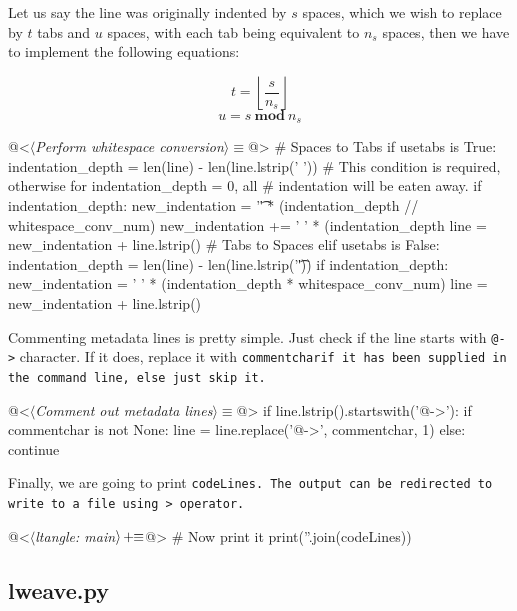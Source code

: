 Let us say the line was originally indented by $s$ spaces, which we wish to replace by $t$ tabs and $u$
spaces, with each tab being equivalent to $n_s$ spaces, then we have to implement the following equations: 

$$t = \left\lfloor \frac{s}{n_s} \right\rfloor$$
$$u = s\ \mathbf{mod}\ n_s$$

\begin{code}
@<$\langle$\textit{Perform whitespace conversion}$\rangle\equiv$@>
# Spaces to Tabs
if usetabs is True:
    indentation_depth = len(line) - len(line.lstrip(' '))
    # This condition is required, otherwise for indentation_depth = 0, all
    # indentation will be eaten away.
    if indentation_depth:
        new_indentation = '\t' * (indentation_depth // whitespace_conv_num)
        new_indentation += ' ' * (indentation_depth %
        line = new_indentation + line.lstrip()
# Tabs to Spaces
elif usetabs is False:
    indentation_depth = len(line) - len(line.lstrip('\t'))
    if indentation_depth:
        new_indentation = ' ' * (indentation_depth * whitespace_conv_num)
        line = new_indentation + line.lstrip()
\end{code}

Commenting metadata lines is pretty simple. Just check if the line starts with \verb|@->| character. If it
does, replace it with \tt commentchar\rm  if it has been supplied in the command line, else just skip it.

\begin{code}
@<$\langle$\textit{Comment out metadata lines}$\rangle\equiv$@>
if line.lstrip().startswith('@->'):
    if commentchar is not None:
        line = line.replace('@->', commentchar, 1)
    else:
        continue

\end{code}

Finally, we are going to print \tt codeLines\rm. The output can be redirected to write to a file using \tt >
\rm operator.

\begin{oldcode}
@<$\langle$\textit{ltangle: main}$\rangle \thinspace +\!\!\equiv$@>
# Now print it
print(''.join(codeLines))

\end{oldcode}

\subsection{lweave.py}

